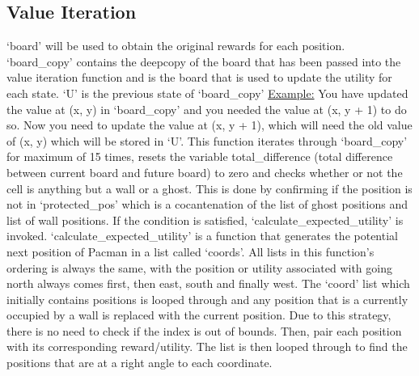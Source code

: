 \documentclass[12pt]{report}
\begin{document}
      \subsection*{Value Iteration}
        `board' will be used to obtain the original rewards for each position.
        \newline `board\_copy' contains the deepcopy of the board that has been passed into the value iteration function and is the board that is used to update the utility for each state.
        \newline `U' is the previous state of `board\_copy'
        \newline
        \newline \hspace*{1cm} \underline{Example:}
        \newline \hspace*{1cm} You have updated the value at (x, y) in `board\_copy' and you needed the value at (x, y + 1) \hspace*{1cm} to do so. Now you need to update the value at (x, y + 1), which will need the old value of (x, \hspace*{1cm} y) which will be stored in `U'.
        \newline \newline
        This function iterates through `board\_copy' for maximum of 15 times, resets the variable total\_difference (total difference between current board and future board) to zero and checks whether or not the cell is anything but a wall or a ghost. This is done by confirming if the position is not in `protected\_pos' which is a cocantenation of the list of ghost positions and list of wall positions. If the condition is satisfied, `calculate\_expected\_utility' is invoked.
        \newline \newline
        `calculate\_expected\_utility' is a function that generates the potential next position of Pacman in a list called `coords'. All lists in this function's ordering is always the same, with the position or utility associated with going north always comes first, then east, south and finally west. The `coord' list which initially contains positions is looped through and any position that is a currently occupied by a wall is replaced with the current position. Due to this strategy, there is no need to check if the index is out of bounds. Then, pair each position with its corresponding reward/utility. The list is then looped through to find the positions that are at a right angle to each coordinate.
\end{document}
